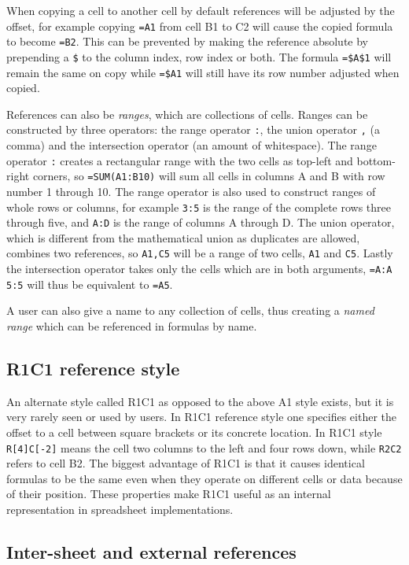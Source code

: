 \documentclass[12pt,a4paper,onecolumn,oneside]{memoir}
\newcommand{\f}[1]{\texttt{#1}}
\begin{document}
When copying a cell to another cell by default references will be adjusted by the offset, for example copying \f{=A1} from cell B1 to C2 will cause the copied formula to become \f{=B2}.
This can be prevented by making the reference absolute by prepending a \f{\$} to the column index, row index or both.
The formula \f{=\$A\$1} will remain the same on copy while \f{=\$A1} will still have its row number adjusted when copied.

References can also be \emph{ranges}, which are collections of cells.
Ranges can be constructed by three operators: the range operator \f{:}, the union operator \f{,} (a comma) and the intersection operator \f{} (an amount of whitespace).
The range operator \f{:} creates a rectangular range with the two cells as top-left and bottom-right corners, so \f{=SUM(A1:B10)} will sum all cells in columns A and B with row number 1 through 10.
The range operator is also used to construct ranges of whole rows or columns, for example \f{3:5} is the range of the complete rows three through five, and \f{A:D} is the range of columns A through D.
The union operator, which is different from the mathematical union as duplicates are allowed, combines two references, so \f{A1,C5} will be a range of two cells, \f{A1} and \f{C5}.
Lastly the intersection operator takes only the cells which are in both arguments, \f{=A:A 5:5} will thus be equivalent to \f{=A5}.

A user can also give a name to any collection of cells, thus creating a \emph{named range} which can be referenced in formulas by name.

\subsection{R1C1 reference style}

An alternate style called R1C1 as opposed to the above A1 style exists, but it is very rarely seen or used by users.
In R1C1 reference style one specifies either the offset to a cell between square brackets or its concrete location.
In R1C1 style \f{R[4]C[-2]} means the cell two columns to the left and four rows down, while \f{R2C2} refers to cell B2.
The biggest advantage of R1C1 is that it causes identical formulas to be the same even when they operate on different cells or data because of their position.
These properties make R1C1 useful as an internal representation in spreadsheet implementations.

\subsection{Inter-sheet and external references}
\label{subsection:ExternalRefsDDE}
\end{document}

